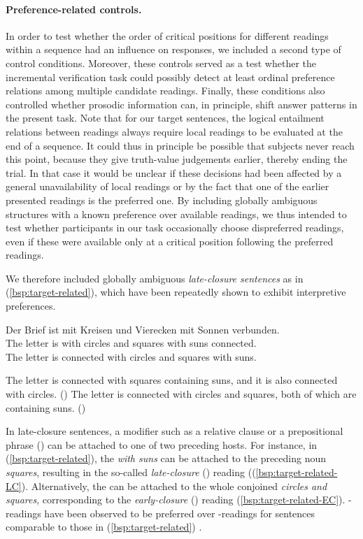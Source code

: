 \documentclass[fleqn,reqno,10pt,draft]{article}
\newcommand{\lc}{\acro{lc}}
\newcommand{\ec}{\acro{ec}}
\begin{document}
\paragraph{Preference-related controls.} In order to test whether the
order of critical positions for different readings within a sequence
had an influence on responses, we included a second type of control
conditions. Moreover, these controls served as a test whether the
incremental verification task could possibly detect at least ordinal
preference relations among multiple candidate readings. Finally, these
conditions also controlled whether prosodic information can, in
principle, shift answer patterns in the present task. Note that for
our target sentences, the logical entailment relations between
readings always require local readings to be evaluated at the end of a
sequence. It could thus in principle be possible that subjects never
reach this point, because they give truth-value judgements earlier,
thereby ending the trial. In that case it would be unclear if these
decisions had been affected by a general unavailability of local
readings or by the fact that one of the earlier presented readings is
the preferred one. By including globally ambiguous structures with a
known preference over available readings, we thus intended to test
whether participants in our task occasionally choose dispreferred
readings, even if these were available only at a critical position
following the preferred readings.

We therefore included globally ambiguous \emph{late-closure
  sentences} as in (\ref{bsp:target-related}), which have been
repeatedly shown to exhibit interpretive preferences.
\begin{exe}
\ex \gll Der Brief ist mit Kreisen und Vierecken mit Sonnen
  verbunden. \label{bsp:target-related}\\
The letter is with circles and squares with suns connected.\\
The letter is connected with circles and squares with suns.
\begin{xlist}
  \ex \label{bsp:target-related-LC} The letter is connected with squares containing suns, and it is
    also connected with circles. \hfill{(\lc)}
  \ex \label{bsp:target-related-EC} The letter is connected with circles and squares, both of which
    are containing suns.  \hfill{(\ec)} 
\end{xlist}

\end{exe}
In late-closure sentences, a modifier such as a relative clause or a
prepositional phrase () can be attached to one of two
preceding hosts. For instance, in (\ref{bsp:target-related}), the
 \emph{with suns} can be attached to the preceding noun
\emph{squares}, resulting in the so-called \emph{late-closure} (\lc)
reading ((\ref{bsp:target-related-LC}). Alternatively, the 
can be attached to the whole conjoined  \emph{circles and
  squares}, corresponding to the \emph{early-closure} (\ec) reading
(\ref{bsp:target-related-EC}).  \lc-readings have been observed to be
preferred over \ec-readings for sentences comparable to those in
(\ref{bsp:target-related}) \citep[e.g.][]{Frazier87,Frazier82}.
\end{document}
